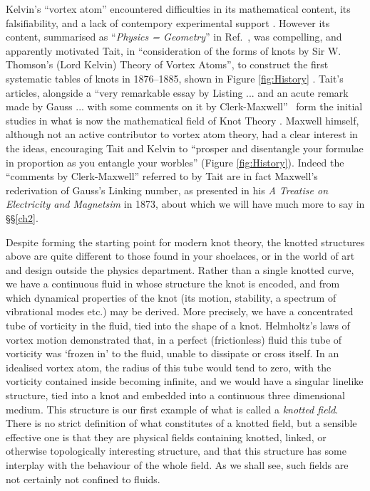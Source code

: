 Kelvin's ``vortex atom'' encountered difficulties in its mathematical content, its falsifiability, and a lack of contempory experimental support \citep{KelvinMasters}. However its content, summarised as ``\textit{Physics = Geometry}'' in Ref.~\citep{KelvinAMS}, was compelling, and apparently motivated Tait, in ``consideration of the forms of knots by Sir W. Thomson's (Lord Kelvin) Theory of Vortex Atoms'', to construct the first systematic tables of knots in 1876--1885, shown in Figure \ref{fig:History} \citep{Tait1, Tait2, Tait3}. Tait's articles, alongside a ``very remarkable essay by Listing ... and an acute remark made by Gauss ... with some comments on it by Clerk-Maxwell''~\citep{Tait1} form the initial studies in  what is now the mathematical field of Knot Theory \citep{Lickorish1997}. Maxwell himself, although not an active contributor to vortex atom theory, had a clear interest in the ideas, encouraging Tait and Kelvin to ``prosper and disentangle your formulae in proportion as you entangle your worbles'' (Figure \ref{fig:History}). Indeed the ``comments by Clerk-Maxwell'' referred to by Tait are in fact Maxwell's rederivation of Gauss's Linking number, as presented in his \textit{A Treatise on Electricity and Magnetsim} \citep{Maxwell2} in 1873, about which we will have much more to say in \S\S\ref{ch2}. 

Despite forming the starting point for modern knot theory, the knotted structures above are quite different to those found in your shoelaces, or in the world of art and design outside the physics department. Rather than a single knotted curve, we have a continuous fluid in whose structure the knot is encoded, and from which dynamical properties of the knot (its motion, stability, a spectrum of vibrational modes etc.) may be derived. More precisely, we have a concentrated tube of vorticity in the fluid, tied into the shape of a knot. Helmholtz's laws of vortex motion demonstrated that, in a perfect (frictionless) fluid this tube of vorticity was `frozen in' to the fluid, unable to dissipate or cross itself. In an idealised vortex atom, the radius of this tube would tend to zero, with the vorticity contained inside becoming infinite, and we would have a singular linelike structure, tied into a knot and embedded into a continuous three dimensional medium. This structure is our first example of what is called a \emph{knotted field}. There is no strict definition of what constitutes of a knotted field, but a sensible effective one is that they are physical fields containing knotted, linked, or otherwise topologically interesting structure, and that this structure has some interplay with the behaviour of the whole field. As we shall see, such fields are not certainly not confined to fluids.


